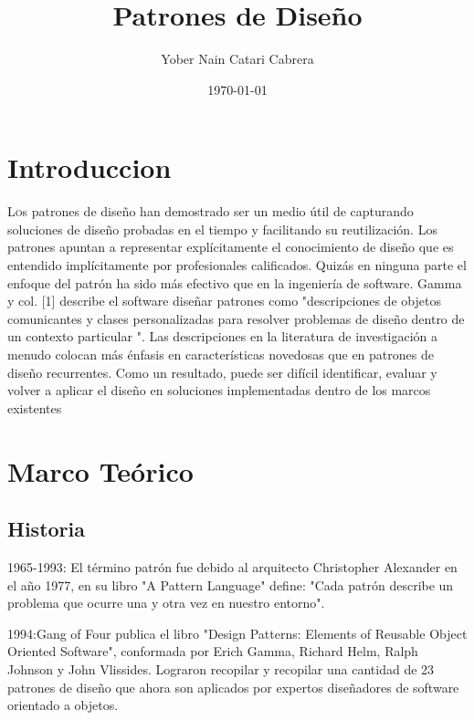 \documentclass[twoside,twocolumn]{article}
\title{Patrones de Diseño} %
\author{Yober Nain Catari Cabrera }
\date{\today} %
\begin{document}
\maketitle


\section{Introduccion}

\lettrine[nindent=0em,lines=3]{L}os patrones de diseño han demostrado ser un medio útil de
capturando soluciones de diseño probadas en el tiempo y facilitando su reutilización.
Los patrones apuntan a representar explícitamente el conocimiento de diseño que es
entendido implícitamente por profesionales calificados.
Quizás en ninguna parte el enfoque del patrón ha sido más efectivo
que en la ingeniería de software. Gamma y col. [1] describe el software
diseñar patrones como "descripciones de objetos comunicantes y
clases personalizadas para resolver problemas de diseño dentro de un
contexto particular ".
Las descripciones en la literatura de investigación a menudo colocan más
énfasis en características novedosas que en patrones de diseño recurrentes. Como un
resultado, puede ser difícil identificar, evaluar y volver a aplicar el diseño
en soluciones implementadas dentro de los marcos existentes


\section {Marco Teórico}\label{sec:3}
\subsection{Historia}
1965-1993: El término patrón fue debido al arquitecto Christopher Alexander en el año 1977, en su libro "A Pattern Language" define: "Cada patrón describe un problema que ocurre una y otra vez en nuestro entorno".

1994:Gang of Four publica el libro "Design Patterns: Elements of Reusable Object Oriented Software", conformada por Erich Gamma, Richard Helm, Ralph Johnson y John Vlissides. Lograron recopilar y recopilar una cantidad de 23 patrones de diseño que ahora son aplicados por expertos diseñadores de software orientado a objetos.
\end{document}
